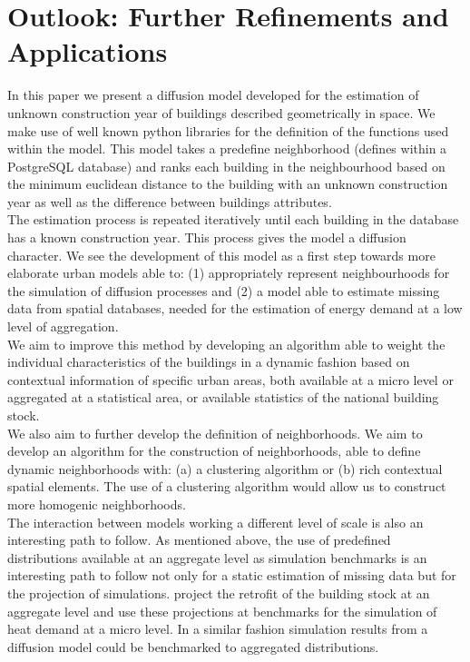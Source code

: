 \section{Outlook: Further Refinements and Applications}

In this paper we present a diffusion model developed for the estimation of
unknown construction year of buildings described geometrically in space. We
make use of well known python libraries for the definition of the functions
used within the model. This model takes a predefine neighborhood (defines
within a PostgreSQL database) and ranks each building in the neighbourhood
based on the minimum euclidean distance to the building with an unknown
construction year as well as the difference between buildings attributes.\\

The estimation process is repeated iteratively until each building in the
database has a known construction year. This process gives the model a
diffusion character. We see the development of this model as a first step
towards more elaborate urban models able to: (1) appropriately represent
neighbourhoods for the simulation of diffusion processes and (2) a model able
to estimate missing data from spatial databases, needed for the estimation of
energy demand at a low level of aggregation.\\

We aim to improve this method by developing an algorithm able to weight the
individual characteristics of the buildings in a dynamic fashion based on
contextual information of specific urban areas, both available at a micro level
or aggregated at a statistical area, or available statistics of the national
building stock.\\

We also aim to further develop the definition of neighborhoods. We aim to
develop an algorithm for the construction of neighborhoods, able to define
dynamic neighborhoods with: (a) a clustering algorithm or (b) rich contextual
spatial elements. The use of a clustering algorithm would allow us to construct
more homogenic neighborhoods.\\

The interaction between models working a different level of scale is also an
interesting path to follow. As mentioned above, the use of predefined
distributions available at an aggregate level as simulation benchmarks is an
interesting path to follow not only for a static estimation of missing data but
for the projection of simulations. \citet{MunozH.2015.IBPSA.Pop} project the
retrofit of the building stock at an aggregate level and use these projections
at benchmarks for the simulation of heat demand at a micro level. In a similar
fashion simulation results from a diffusion model could be benchmarked to
aggregated distributions.\\

